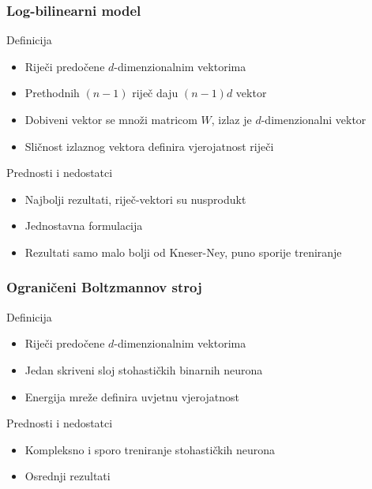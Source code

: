 \documentclass[utf8]{beamer}
\begin{document}
\begin{frame}
\frametitle{Log-bilinearni model}

	\begin{block}{Definicija}
	\begin{itemize}[<+->]
		\item{Riječi predočene $d$-dimenzionalnim vektorima}
		\item{Prethodnih $(n - 1)$ riječ daju $(n - 1) d$ vektor}
		\item{Dobiveni vektor se množi matricom $W$, izlaz je $d$-dimenzionalni vektor}
		\item{Sličnost izlaznog vektora definira vjerojatnost riječi}
	\end{itemize}
	\end{block}

	\begin{block}{Prednosti i nedostatci}
	\begin{itemize}[<+->]
		\item{Najbolji rezultati, riječ-vektori su nusprodukt}
		\item{Jednostavna formulacija}
		\item{Rezultati samo malo bolji od Kneser-Ney, puno sporije treniranje}
	\end{itemize}
	\end{block}

\end{frame}

\begin{frame}
\frametitle{Ograničeni Boltzmannov stroj}

	\begin{block}{Definicija}
	\begin{itemize}[<+->]
		\item{Riječi predočene $d$-dimenzionalnim vektorima}
		\item{Jedan skriveni sloj stohastičkih binarnih neurona}
		\item{Energija mreže definira uvjetnu vjerojatnost}
	\end{itemize}
	\end{block}

	\begin{block}{Prednosti i nedostatci}
	\begin{itemize}[<+->]
		\item{Kompleksno i sporo treniranje stohastičkih neurona}
		\item{Osrednji rezultati}
	\end{itemize}
	\end{block}

\end{frame}
\end{document}
